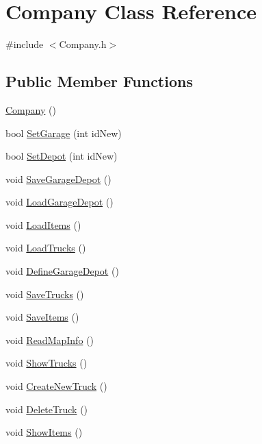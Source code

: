 \hypertarget{class_company}{}\section{Company Class Reference}
\label{class_company}


{\ttfamily \#include $<$Company.\+h$>$}

\subsection*{Public Member Functions}
\begin{DoxyCompactItemize}
\item 
\hyperlink{class_company_a29937dda711b09df306ae7ca9b3d6b42}{Company} ()
\item 
bool \hyperlink{class_company_a1d8baa0700d407dc04626234dfc64a7d}{Set\+Garage} (int id\+New)
\item 
bool \hyperlink{class_company_a53709d013e28ce90c369bbe1e03bdb19}{Set\+Depot} (int id\+New)
\item 
void \hyperlink{class_company_a892a266f60a3ebb48aabec485c8682ca}{Save\+Garage\+Depot} ()
\item 
void \hyperlink{class_company_a34305fee36acf01975783bf93cd32c83}{Load\+Garage\+Depot} ()
\item 
void \hyperlink{class_company_a359fed3b390aadca60f0eeb65e44cda2}{Load\+Items} ()
\item 
void \hyperlink{class_company_a2c673aac2437a245382a0cd6217f96dd}{Load\+Trucks} ()
\item 
void \hyperlink{class_company_a6c9b5750fa7f70961ddf4dae6b638e13}{Define\+Garage\+Depot} ()
\item 
void \hyperlink{class_company_a7a9675d884dc91258bec9b9c0eddb60a}{Save\+Trucks} ()
\item 
void \hyperlink{class_company_a4b4783489c0427134446b37588b7e05b}{Save\+Items} ()
\item 
void \hyperlink{class_company_a211481ef27f89e22960bc9fc820dde31}{Read\+Map\+Info} ()
\item 
void \hyperlink{class_company_a7464ae89c480c4df2a2d184c80923a39}{Show\+Trucks} ()
\item 
void \hyperlink{class_company_a271a395f425f118b47fab9fec33ffe95}{Create\+New\+Truck} ()
\item 
void \hyperlink{class_company_a92516e226d988ce58fd0f2c2f4d8734d}{Delete\+Truck} ()
\item 
void \hyperlink{class_company_a7df9ce7731ddba2b100bc1e4e76f45b8}{Show\+Items} ()

\end{DoxyCompactItemize}
